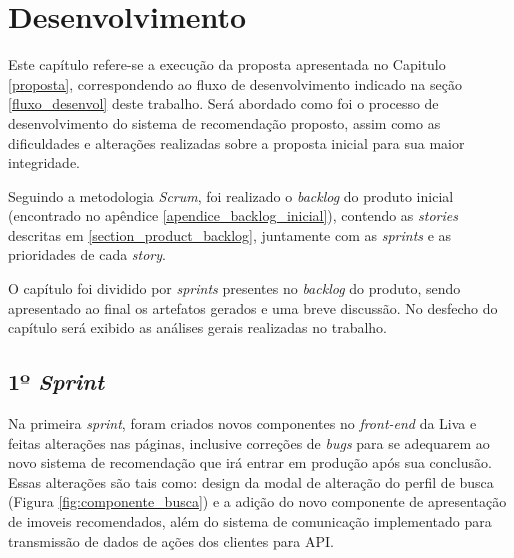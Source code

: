 \chapter{Desenvolvimento}
\label{desenvolvimento}

Este capítulo refere-se a execução da proposta apresentada no Capitulo \ref{proposta}, correspondendo ao fluxo de desenvolvimento indicado na seção \ref{fluxo_desenvol} deste trabalho. Será abordado como foi o processo de desenvolvimento do sistema de recomendação proposto, assim como as dificuldades e alterações realizadas sobre a proposta inicial para sua maior integridade.

Seguindo a metodologia \textit{Scrum}, foi realizado o \textit{backlog} do produto inicial (encontrado no apêndice \ref{apendice_backlog_inicial}), contendo as \textit{stories} descritas em \ref{section_product_backlog}, juntamente com as \textit{sprints} e as prioridades de cada \textit{story}.

O capítulo foi dividido por \textit{sprints} presentes no \textit{backlog} do produto, sendo apresentado ao final os artefatos gerados e uma breve discussão. No desfecho do capítulo será exibido as análises gerais realizadas no trabalho.

\section{1º \textit{Sprint}}

Na primeira \textit{sprint}, foram criados novos componentes no \textit{front-end} da Liva e feitas alterações nas páginas, inclusive correções de \textit{bugs} para se adequarem ao novo sistema de recomendação que irá entrar em produção após sua conclusão. Essas alterações são tais como: design da modal de alteração do perfil de busca (Figura \ref{fig:componente_busca}) e a adição do novo componente de apresentação de imoveis recomendados, além do sistema de comunicação implementado para transmissão de dados de ações dos clientes para API.

